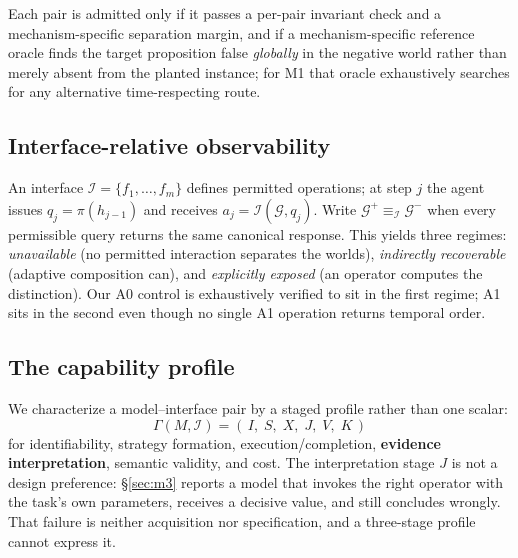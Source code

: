 \documentclass[sigconf,anonymous,review]{acmart}
\newcommand{\Gp}{\mathcal{G}^{+}}
\newcommand{\Gm}{\mathcal{G}^{-}}
\begin{document}
Each pair is admitted only if it passes a per-pair invariant check and a mechanism-specific
separation margin, and if a mechanism-specific reference oracle finds the target proposition false
\emph{globally} in the negative world rather than merely absent from the planted instance; for
M1 that oracle exhaustively searches for any alternative time-respecting route.

\subsection{Interface-relative observability}
An interface $\mathcal{I}=\{f_1,\dots,f_m\}$ defines permitted operations; at step $j$ the agent
issues $q_j=\pi(h_{j-1})$ and receives $a_j=\mathcal{I}(\mathcal{G},q_j)$. Write
$\Gp \equiv_{\mathcal{I}} \Gm$ when every permissible query returns the same canonical response.
This yields three regimes: \emph{unavailable} (no permitted interaction separates the worlds),
\emph{indirectly recoverable} (adaptive composition can), and \emph{explicitly exposed} (an
operator computes the distinction). Our A0 control is exhaustively verified to sit in the first
regime; A1 sits in the second even though no single A1 operation returns temporal order.

\subsection{The capability profile}
We characterize a model--interface pair by a staged profile rather than one scalar:
\begin{equation}
\Gamma(M,\mathcal{I}) = (\,I,\; S,\; X,\; J,\; V,\; K\,)
\end{equation}
for identifiability, strategy formation, execution/completion, \textbf{evidence interpretation},
semantic validity, and cost. The interpretation stage $J$ is not a design preference: \S\ref{sec:m3}
reports a model that invokes the right operator with the task's own parameters, receives a decisive
value, and still concludes wrongly. That failure is neither acquisition nor specification, and a
three-stage profile cannot express it.
\end{document}
